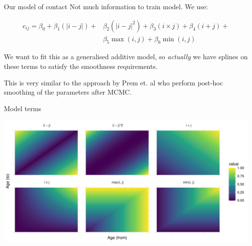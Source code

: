 \documentclass[
  14pt,
  ignorenonframetext,
  aspectratio=169,
]{beamer}
\begin{document}
\begin{frame}{Our model of contact}
\label{our-model-of-contact}
Not much information to train model. We use:

\[\begin{aligned}
c_{ij} = \beta_0 + \beta_1(|i-j|) + &\beta_2(|i-j|^2) + \beta_3(i\times j) + \beta_4(i+j) +\\ &\beta_5\max(i, j) + \beta_6\min(i, j)
\end{aligned}
\]

\begin{tcolorbox}[enhanced jigsaw, title=\textcolor{quarto-callout-tip-color}{\faLightbulb}\hspace{0.5em}{🤓 Akshually 🤓}, opacityback=0, opacitybacktitle=0.6, colbacktitle=quarto-callout-tip-color!10!white, bottomrule=.15mm, toprule=.15mm, toptitle=1mm, arc=.35mm, titlerule=0mm, colframe=quarto-callout-tip-color-frame, rightrule=.15mm, bottomtitle=1mm, leftrule=.75mm, coltitle=black, left=2mm, colback=white, breakable]

We want to fit this as a generalised additive model, so \emph{actually}
we have splines on these terms to satisfy the smoothness requirements.

This is very similar to the approach by Prem et. al who perform post-hoc
smoothing of the parameters after MCMC.

\end{tcolorbox}
\end{frame}

\begin{frame}{Model terms}
\label{model-terms}
\begin{center}
\includegraphics{index_files/figure-beamer/unnamed-chunk-3-1.pdf}
\end{center}
\end{frame}
\end{document}
